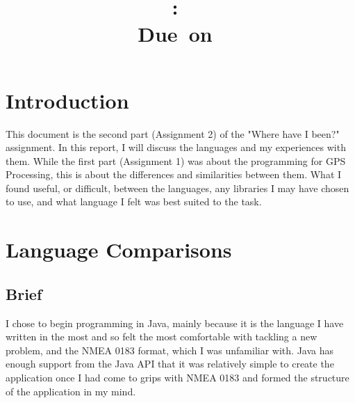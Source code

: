 \documentclass{article}
\title{
\vspace{2in}
\textmd{\textbf{\hmwkClass:\ \hmwkTitle}}\\
\normalsize\vspace{0.1in}\small{Due\ on\ \hmwkDueDate}\\
\vspace{3in}
}
\author{\textbf{\hmwkAuthorName}}
\date{} %
\begin{document}
\maketitle



\newpage
\tableofcontents
\newpage



\section{Introduction}
This document is the second part (Assignment 2\cite{assignment}) of the "Where have I been?" assignment. In this report, I will discuss the languages and my experiences with them. While the first part (Assignment 1) was about the programming for GPS Processing, this is about the differences and similarities between them. What I found useful, or difficult, between the languages, any libraries I may have chosen to use, and what language I felt was best suited to the task.



\section{Language Comparisons}

\subsection{Brief}

I chose to begin programming in Java, mainly because it is the language I have written in the most and so felt the most comfortable with tackling a new problem, and the NMEA 0183 format, which I was unfamiliar with. Java has enough support from the Java API that it was relatively simple to create the application once I had come to grips with NMEA 0183 and formed the structure of the application in my mind.
\end{document}
